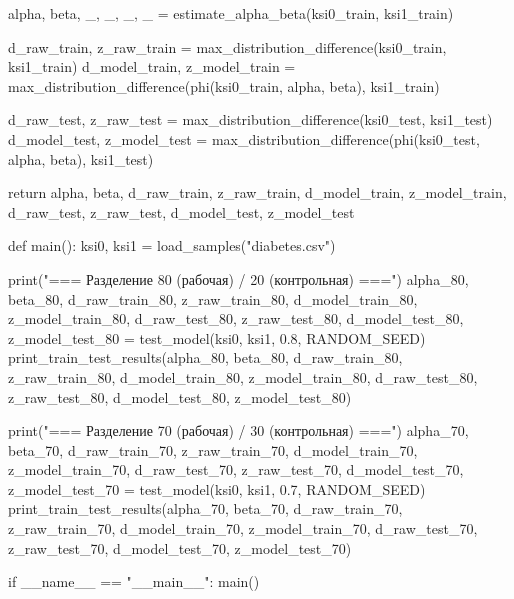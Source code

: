 \documentclass[a4paper, 14pt]{extarticle}
\begin{document}
\begin{breakablelisting}
    alpha, beta, _, _, _, _ = estimate_alpha_beta(ksi0_train, ksi1_train)
    
    d_raw_train, z_raw_train = max_distribution_difference(ksi0_train, ksi1_train)
    d_model_train, z_model_train = max_distribution_difference(phi(ksi0_train, alpha, beta), ksi1_train)
    
    d_raw_test, z_raw_test = max_distribution_difference(ksi0_test, ksi1_test)
    d_model_test, z_model_test = max_distribution_difference(phi(ksi0_test, alpha, beta), ksi1_test)
    
    return alpha, beta, d_raw_train, z_raw_train, d_model_train, z_model_train, d_raw_test, z_raw_test, d_model_test, z_model_test


def main():
    ksi0, ksi1 = load_samples("diabetes.csv")
    
    print("=== Разделение 80 (рабочая) / 20 (контрольная) ===")
    alpha_80, beta_80, d_raw_train_80, z_raw_train_80, d_model_train_80, z_model_train_80, d_raw_test_80, z_raw_test_80, d_model_test_80, z_model_test_80 = test_model(ksi0, ksi1, 0.8, RANDOM_SEED)
    print_train_test_results(alpha_80, beta_80, d_raw_train_80, z_raw_train_80, d_model_train_80, z_model_train_80, d_raw_test_80, z_raw_test_80, d_model_test_80, z_model_test_80)
    
    print("\n=== Разделение 70 (рабочая) / 30 (контрольная) ===")
    alpha_70, beta_70, d_raw_train_70, z_raw_train_70, d_model_train_70, z_model_train_70, d_raw_test_70, z_raw_test_70, d_model_test_70, z_model_test_70 = test_model(ksi0, ksi1, 0.7, RANDOM_SEED)
    print_train_test_results(alpha_70, beta_70, d_raw_train_70, z_raw_train_70, d_model_train_70, z_model_train_70, d_raw_test_70, z_raw_test_70, d_model_test_70, z_model_test_70)


if __name__ == "__main__":
    main()
\end{breakablelisting}
\end{document}
